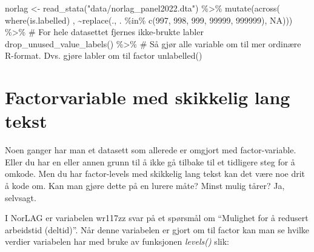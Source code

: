\documentclass[
  letterpaper,
  DIV=11,
  numbers=noendperiod]{scrreprt}
\newenvironment{Shaded}{\begin{snugshade}}{\end{snugshade}}
\newcommand{\CommentTok}[1]{\textcolor[rgb]{0.37,0.37,0.37}{#1}}
\newcommand{\ConstantTok}[1]{\textcolor[rgb]{0.56,0.35,0.01}{#1}}
\newcommand{\DecValTok}[1]{\textcolor[rgb]{0.68,0.00,0.00}{#1}}
\newcommand{\FunctionTok}[1]{\textcolor[rgb]{0.28,0.35,0.67}{#1}}
\newcommand{\NormalTok}[1]{\textcolor[rgb]{0.00,0.23,0.31}{#1}}
\newcommand{\OtherTok}[1]{\textcolor[rgb]{0.00,0.23,0.31}{#1}}
\newcommand{\SpecialCharTok}[1]{\textcolor[rgb]{0.37,0.37,0.37}{#1}}
\newcommand{\StringTok}[1]{\textcolor[rgb]{0.13,0.47,0.30}{#1}}
\begin{document}
\begin{Shaded}
\begin{Highlighting}[]
\NormalTok{norlag }\OtherTok{\textless{}{-}} \FunctionTok{read\_stata}\NormalTok{(}\StringTok{"data/norlag\_panel2022.dta"}\NormalTok{) }\SpecialCharTok{\%\textgreater{}\%} 
    \FunctionTok{mutate}\NormalTok{(}\FunctionTok{across}\NormalTok{( }\FunctionTok{where}\NormalTok{(is.labelled) ,  }\SpecialCharTok{\textasciitilde{}}\FunctionTok{replace}\NormalTok{(., }
\NormalTok{                                        . }\SpecialCharTok{\%in\%} \FunctionTok{c}\NormalTok{(}\DecValTok{997}\NormalTok{, }\DecValTok{998}\NormalTok{, }\DecValTok{999}\NormalTok{, }\DecValTok{99999}\NormalTok{, }\DecValTok{999999}\NormalTok{), }
                                        \ConstantTok{NA}\NormalTok{))) }\SpecialCharTok{\%\textgreater{}\%}
  \CommentTok{\# For hele datasettet fjernes ikke{-}brukte labler }
  \FunctionTok{drop\_unused\_value\_labels}\NormalTok{() }\SpecialCharTok{\%\textgreater{}\%} 
  \CommentTok{\# Så gjør alle variable om til mer ordinære R{-}format. Dvs. gjøre labler om til factor}
  \FunctionTok{unlabelled}\NormalTok{()}
\end{Highlighting}
\end{Shaded}

\hypertarget{factorvariable-med-skikkelig-lang-tekst}{%
\section{Factorvariable med skikkelig lang
tekst}\label{factorvariable-med-skikkelig-lang-tekst}}

Noen ganger har man et datasett som allerede er omgjort med
factor-variable. Eller du har en eller annen grunn til å ikke gå tilbake
til et tidligere steg for å omkode. Men du har factor-levels med
skikkelig lang tekst kan det være noe drit å kode om. Kan man gjøre
dette på en lurere måte? Minst mulig tårer? Ja, selvsagt.

I NorLAG er variabelen wr117zz svar på et spørsmål om ``Mulighet for å
redusert arbeidstid (deltid)''. Når denne variabelen er gjort om til
factor kan man se hvilke verdier variabelen har med bruke av funksjonen
\emph{levels()} slik:

\begin{Shaded}
\end{Shaded}
\end{document}
